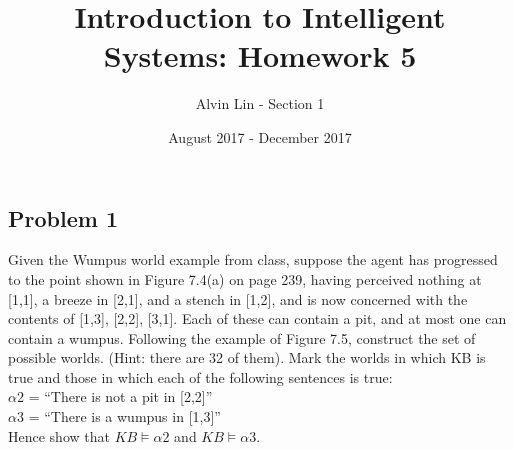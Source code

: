 \documentclass{math}
\title{Introduction to Intelligent Systems: Homework 5}
\author{Alvin Lin - Section 1}
\date{August 2017 - December 2017}
\begin{document}
\maketitle

\subsection*{Problem 1}
Given the Wumpus world example from class, suppose the agent has progressed to
the point shown in Figure 7.4(a) on page 239, having perceived nothing at
[1,1], a breeze in [2,1], and a stench in [1,2], and is now concerned with the
contents of [1,3], [2,2], [3,1]. Each of these can contain a pit, and at most
one can contain a wumpus. Following the example of Figure 7.5, construct the
set of possible worlds. (Hint: there are 32 of them). Mark the worlds in which
KB is true and those in which each of the following sentences is true: \\
\( \alpha2 \) = ``There is not a pit in [2,2]'' \\
\( \alpha3 \) = ``There is a wumpus in [1,3]'' \\
Hence show that \( KB\models\alpha2 \) and \( KB\models\alpha3 \).
\end{document}
